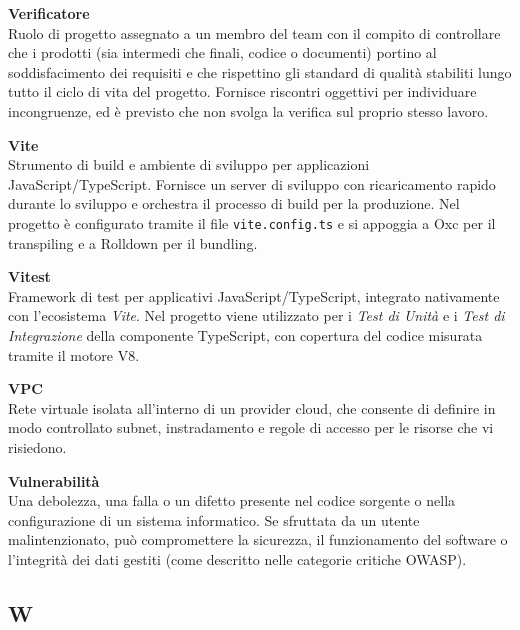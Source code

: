 \documentclass[12pt, a4paper]{article}
\begin{document}
\noindent\hypertarget{verificatore}{\textbf{Verificatore}} \\[0.1em]
Ruolo di progetto assegnato a un membro del team con il compito di controllare che i prodotti (sia intermedi che finali, codice o documenti) portino al soddisfacimento dei requisiti e che rispettino gli standard di qualità stabiliti lungo tutto il ciclo di vita del progetto. Fornisce riscontri oggettivi per individuare incongruenze, ed è previsto che non svolga la verifica sul proprio stesso lavoro.
\vspace{0.5cm}

\noindent\hypertarget{vite}{\textbf{Vite}} \\[0.1em]
Strumento di build e ambiente di sviluppo per applicazioni JavaScript/TypeScript. Fornisce un server di sviluppo con ricaricamento rapido durante lo sviluppo e orchestra il processo di build per la produzione. Nel progetto è configurato tramite il file \texttt{vite.config.ts} e si appoggia a Oxc per il transpiling e a Rolldown per il bundling.
\vspace{0.5cm}

\noindent\hypertarget{vitest}{\textbf{Vitest}} \\[0.1em]
Framework di test per applicativi JavaScript/TypeScript, integrato nativamente con l'ecosistema \textit{Vite}. Nel progetto viene utilizzato per i \textit{Test di Unità} e i \textit{Test di Integrazione} della componente TypeScript, con copertura del codice misurata tramite il motore V8.
\vspace{0.5cm}

\noindent\hypertarget{vpc}{\textbf{VPC}} \\[0.1em]
Rete virtuale isolata all'interno di un provider cloud, che consente di definire in modo controllato subnet, instradamento e regole di accesso per le risorse che vi risiedono.
\vspace{0.5cm}

\noindent\hypertarget{vulnerabilita}{\textbf{Vulnerabilità}} \\[0.1em]
Una debolezza, una falla o un difetto presente nel codice sorgente o nella configurazione di un sistema informatico. Se sfruttata da un utente malintenzionato, può compromettere la sicurezza, il funzionamento del software o l'integrità dei dati gestiti (come descritto nelle categorie critiche OWASP).
\vspace{0.1cm}

\newpage
\subsection*{W}
{}
\vspace{0.2cm}
\end{document}
